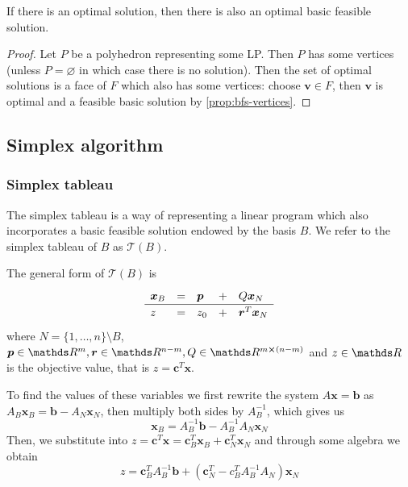 \documentclass[12pt]{extarticle}
\renewcommand{\vec}[1]{\bm{#1}}
\begin{document}
\begin{corollary}{}{}
	If there is an optimal solution, then there is also an optimal basic feasible solution.
\end{corollary}
\begin{proof}
	Let $P$ be a polyhedron representing some LP. Then $P$ has some vertices (unless $P = \varnothing$
	in which case there is no solution).
	Then the set of optimal solutions is a face of $F$ which also has some vertices:
	choose $\vec v \in F$, then $\vec v$ is optimal and a feasible basic solution by
	\cref{prop:bfs-vertices}.
\end{proof}

\subsection{Simplex algorithm}

\subsubsection{Simplex tableau}

The simplex tableau is a way of representing a linear program which also incorporates a basic
feasible solution endowed by the basis $B$.
We refer to the simplex tableau of $B$ as $\mathcal T(B)$.

The general form of $\mathcal T(B)$ is
\begin{equation}
	\def\arraystretch{1.2}
	\begin{array}{lllll}
		\vec x_B & = & \vec p & + & Q \vec x_N        \\
		\hline
		z        & = & z_0    & + & \vec r^T \vec x_N
	\end{array}
\end{equation}
where $N = \{1, \dots, n\} \setminus B$, $\vec p \in \R^m, \vec r \in \R^{n-m}, Q \in \R^{m
		\cross(n-m)}$ and $z \in \R$ is the objective value, that is $z = \vec c^T \vec x$.

To find the values of these variables we first rewrite the system $A\vec x = \vec b$ as
$A_B \vec x_B = \vec b - A_N \vec x_N$, then multiply both sides by $A_B^{-1}$, which gives us
\begin{equation}
	\vec x_B = A_B^{-1} \vec b - A_B^{-1} A_N \vec x_N
\end{equation}
Then, we substitute into $z = \vec c^T \vec x = \vec c^T_B \vec x_B + \vec c^T_N \vec x_N$
and through some algebra we obtain
\begin{equation}
	z = \vec c^T_B A^{-1}_B \vec b + (\vec c^T_N - c^T_B A_B^{-1} A_N) \vec x_N
\end{equation}
\end{document}
